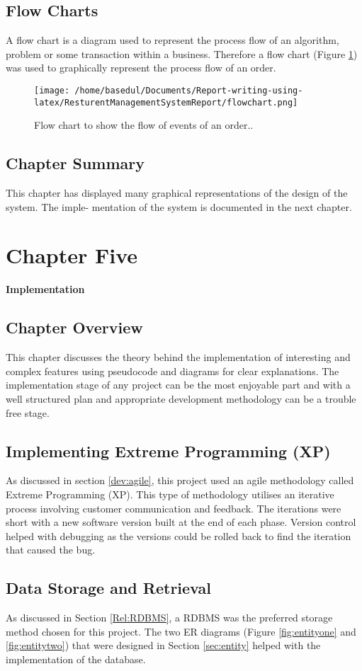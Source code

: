 \documentclass[12pt,a4paper]{article}
\begin{document}
\subsection{Flow Charts}
	A flow chart is a diagram used to represent the process flow of an algorithm, problem or some transaction
within a business. Therefore a flow chart (Figure \ref{fig:flowchart}) was used to graphically represent the process
flow of an order.
\begin{figure}[H]
		\centering
		\texttt{[image: /home/basedul/Documents/Report-writing-using-latex/ResturentManagementSystemReport/flowchart.png]}
		\caption{Flow chart to show the flow of events of an order..}
		\label{fig:flowchart} 
\end{figure}
\subsection{Chapter Summary}
	This chapter has displayed many graphical representations of the design of the system. The imple-
mentation of the system is documented in the next chapter.
\newpage
\section{Chapter Five}
{\bfseries \Large Implementation}
	\subsection{Chapter Overview}
	This chapter discusses the theory behind the implementation of interesting and complex features using
pseudocode and diagrams for clear explanations. The implementation stage of any project can be the
most enjoyable part and with a well structured plan and appropriate development methodology can be
a trouble free stage.
	\subsection{Implementing Extreme Programming (XP)}
	As discussed in section \ref{dev:agile}, this project used an agile methodology called Extreme Programming (XP).
This type of methodology utilises an iterative process involving customer communication and feedback.
The iterations were short with a new software version built at the end of each phase. Version control
helped with debugging as the versions could be rolled back to find the iteration that caused the bug.
\subsection{Data Storage and Retrieval}
	As discussed in Section \ref{Rel:RDBMS}, a RDBMS was the preferred storage method chosen for this project. The two
ER diagrams (Figure \ref{fig:entityone} and \ref{fig:entitytwo}) that were designed in Section \ref{sec:entity} helped with the implementation
of the database.\\
\end{document}
